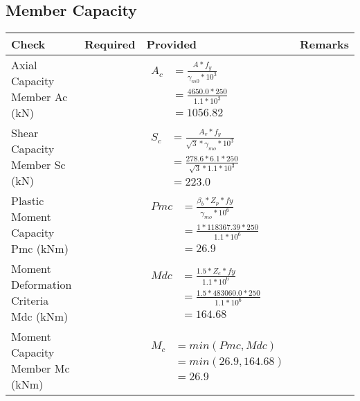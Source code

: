 \documentclass{article}%
\begin{document}
\subsection{Member Capacity}%
\label{subsec:MemberCapacity}%
\renewcommand{\arraystretch}{1.2}%
\begin{longtable}{|p{4cm}|p{5cm}|p{5.5cm}|p{1.5cm}|}%
\hline%
\rowcolor{OsdagGreen}%
Check&Required&Provided&Remarks\\%
\hline%
\endhead%
\hline%
Axial Capacity Member Ac (kN)&&$\begin{aligned} A_c &=\frac{A*f_y}{\gamma_{m0} *10^3}\\ &=\frac{4650.0*250}{1.1* 10^3}\\ &=1056.82\end{aligned}$&\\%
\hline%
Shear Capacity Member Sc (kN)&&$\begin{aligned} S_c &= \frac{A_v*f_y}{\sqrt{3}*\gamma_{mo} *10^3}\\ &=\frac{278.6*6.1*250}{\sqrt{3}*1.1 *10^3}\\ &=223.0\end{aligned}$&\\%
\hline%
Plastic Moment Capacity Pmc (kNm)&&$\begin{aligned} Pmc &= \frac{\beta_b * Z_p *fy}{\gamma_{mo} * 10^6}\\ &=\frac{1*118367.39*250}{1.1 * 10^6}\\ &=26.9\end{aligned}$&\\%
\hline%
Moment Deformation Criteria Mdc (kNm)&&$\begin{aligned} Mdc &= \frac{1.5 *Z_e *fy}{1.1* 10^6}\\ &= \frac{1.5 *483060.0*250}{1.1* 10^6}\\ &= 164.68\end{aligned}$&\\%
\hline%
Moment Capacity Member Mc (kNm)&&$\begin{aligned} M_c &= min(Pmc,Mdc)\\ &=min(26.9,164.68)\\ &=26.9\end{aligned}$&\\%
\hline%
\end{longtable}

%
\newpage%
\end{document}
